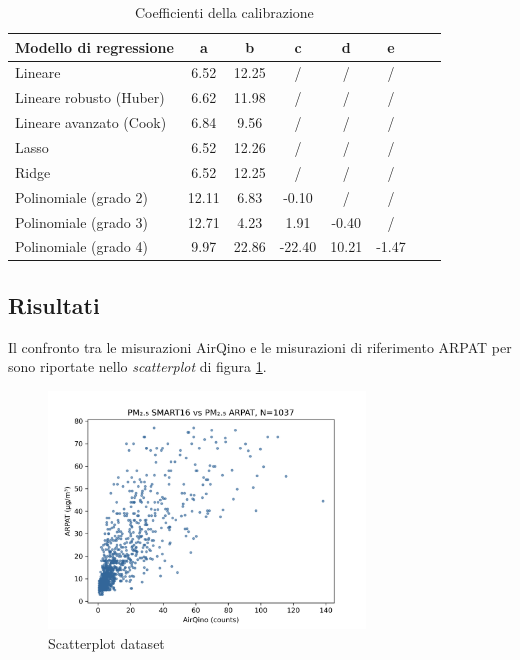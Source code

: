 \begin{table}[H]
    \footnotesize
    \centering
    \begin{tabular}{|l|c|c|c|c|c|c|c|}
    \hline
        \textbf{Modello di regressione} & \textbf{a} & \textbf{b} & \textbf{c} & \textbf{d} & \textbf{e} \\ \hline
        Lineare & 6.52 & 12.25 & / & / & / \\ \hline
        Lineare robusto (Huber) & 6.62 & 11.98 & / & / & / \\ \hline
        Lineare avanzato (Cook) & 6.84 & 9.56 & / & / & / \\ \hline
        Lasso & 6.52 & 12.26 & / & / & / \\ \hline
        Ridge & 6.52 & 12.25 & / & / & / \\ \hline
        Polinomiale (grado 2) & 12.11 & 6.83 & -0.10 & / & / \\ \hline
        Polinomiale (grado 3) & 12.71 & 4.23 & 1.91 & -0.40 & / \\ \hline
        Polinomiale (grado 4) & 9.97 & 22.86 & -22.40 & 10.21 & -1.47 \\ \hline
    \end{tabular}
    \caption{Coefficienti della calibrazione }
    \label{fig:risultati-no2-coefficienti}
\end{table}

\subsection{Risultati }\label{ssec:risultati-pm2.5}

Il confronto tra le misurazioni AirQino e le misurazioni di riferimento ARPAT per  sono riportate nello \textit{scatterplot} di figura \ref{fig:scatterplot_pm2.5}.

\begin{figure}[H]
\centering
\includegraphics[width=0.75\textwidth,height=\textheight,keepaspectratio]{img/sc_pm2.5.png}
\caption{Scatterplot dataset }
\label{fig:scatterplot_pm2.5}
\end{figure}

